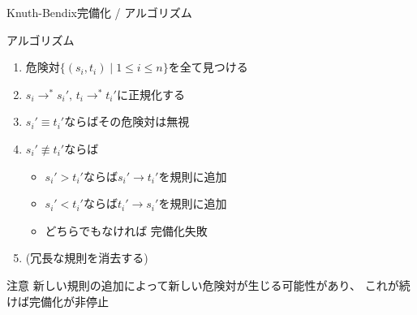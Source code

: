 \documentclass[dvipdfmx,11pt,notheorems]{beamer}
\theoremstyle{definition}
\newcommand{\red}[1]{{\color{red} #1}}
\begin{document}
%
%
%
%
%
%

\begin{frame}{Knuth-Bendix完備化 / アルゴリズム}
  \begin{block}{アルゴリズム}
    \begin{enumerate}
      \item 危険対$\{(s_i, t_i) \mid 1 \leq i \leq n\}$を全て見つける
      \item $s_i \rightarrow^* s_i', \, t_i \rightarrow^* t_i'$に正規化する
      \item $s_i' \equiv t_i'$ならばその危険対は無視
      \item $s_i' \not\equiv t_i'$ならば
      \begin{itemize}
        \item $s_i' > t_i'$ならば$s_i' \rightarrow t_i'$を規則に追加
        \item $s_i' < t_i'$ならば$t_i' \rightarrow s_i'$を規則に追加
        \item どちらでもなければ\red{完備化失敗}
      \end{itemize}

      \item (冗長な規則を消去する)
    \end{enumerate}
  \end{block}

  \begin{alertblock}{注意}
    新しい規則の追加によって新しい危険対が生じる可能性があり、
    これが続けば完備化が非停止
  \end{alertblock}
\end{frame}

\end{document}
